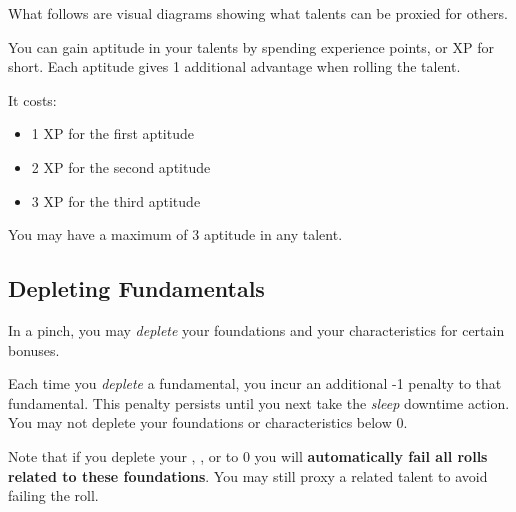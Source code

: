 What follows are visual diagrams showing what talents can be proxied for others.

\begin{GRPfigwide}
\begin{minipage}[t]{0.475\linewidth}
\caption{Talents you can proxy at -2a}
\scriptsize
\end{minipage}%
\hspace{0.05\linewidth}%
\begin{minipage}[t]{0.475\linewidth}
\caption{Talents you can proxy at -4a}
\scriptsize
\end{minipage}
\end{GRPfigwide}

You can gain aptitude in your talents by spending experience points, or XP for short. Each aptitude gives 1 additional advantage when rolling the talent.

It costs:
\begin{itemize}
	\item 1 XP for the first aptitude
	\item 2 XP for the second aptitude
	\item 3 XP for the third aptitude
\end{itemize}

You may have a maximum of 3 aptitude in any talent.

\subsection{Depleting Fundamentals}

In a pinch, you may \emph{deplete} your foundations and your characteristics for certain bonuses.

Each time you \emph{deplete} a fundamental, you incur an additional -1 penalty to that fundamental. This penalty persists until you next take the \emph{sleep} downtime action. You may not deplete your foundations or characteristics below 0.

\vspace{\baselineskip}
\begin{GRPquicknote}
Note that if you deplete your , , or  to 0 you will \textbf{automatically fail all rolls related to these foundations}. You may still proxy a related talent to avoid failing the roll.
\end{GRPquicknote}

